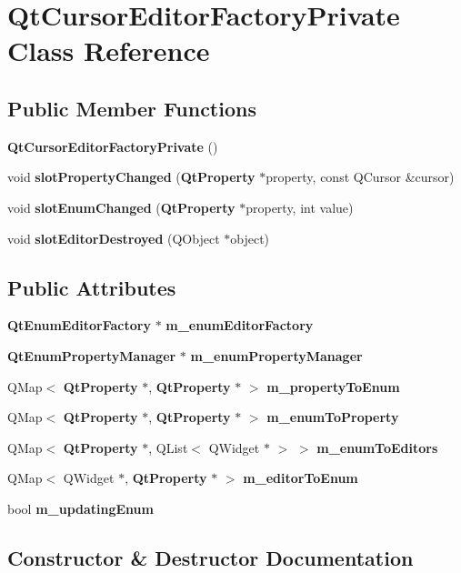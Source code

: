 \section{Qt\+Cursor\+Editor\+Factory\+Private Class Reference}
\label{classQtCursorEditorFactoryPrivate}
\subsection*{Public Member Functions}
\begin{DoxyCompactItemize}
\item 
{\bf Qt\+Cursor\+Editor\+Factory\+Private} ()
\item 
void {\bf slot\+Property\+Changed} ({\bf Qt\+Property} $\ast$property, const Q\+Cursor \&cursor)
\item 
void {\bf slot\+Enum\+Changed} ({\bf Qt\+Property} $\ast$property, int value)
\item 
void {\bf slot\+Editor\+Destroyed} (Q\+Object $\ast$object)
\end{DoxyCompactItemize}
\subsection*{Public Attributes}
\begin{DoxyCompactItemize}
\item 
{\bf Qt\+Enum\+Editor\+Factory} $\ast$ {\bf m\+\_\+enum\+Editor\+Factory}
\item 
{\bf Qt\+Enum\+Property\+Manager} $\ast$ {\bf m\+\_\+enum\+Property\+Manager}
\item 
Q\+Map$<$ {\bf Qt\+Property} $\ast$, {\bf Qt\+Property} $\ast$ $>$ {\bf m\+\_\+property\+To\+Enum}
\item 
Q\+Map$<$ {\bf Qt\+Property} $\ast$, {\bf Qt\+Property} $\ast$ $>$ {\bf m\+\_\+enum\+To\+Property}
\item 
Q\+Map$<$ {\bf Qt\+Property} $\ast$, Q\+List$<$ Q\+Widget $\ast$ $>$ $>$ {\bf m\+\_\+enum\+To\+Editors}
\item 
Q\+Map$<$ Q\+Widget $\ast$, {\bf Qt\+Property} $\ast$ $>$ {\bf m\+\_\+editor\+To\+Enum}
\item 
bool {\bf m\+\_\+updating\+Enum}
\end{DoxyCompactItemize}


\subsection{Constructor \& Destructor Documentation}
